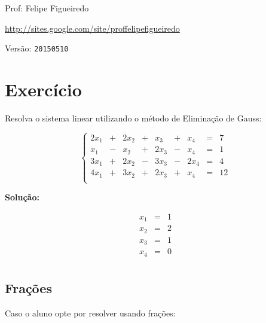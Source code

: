 \documentclass[a4paper]{article}
\begin{document}
\parbox[c]{.825\textwidth}{\raggedright%
{Prof: Felipe Figueiredo\par}
{\url{http://sites.google.com/site/proffelipefigueiredo}\par}
}

Versão: \verb|20150510|




\section{Exercício}

Resolva o sistema linear utilizando o método de Eliminação de Gauss:

\begin{displaymath}
  \left\{
    \begin{array}{ccccccccc}
      2 x_1 &+& 2 x_2  &+&  x_3 &+& x_4 &=&7\\
      x_1 &-& x_2 &+& 2 x_3 &-& x_4 &=&1\\
      3 x_1 &+& 2 x_2 &-& 3 x_3 &-& 2 x_4&=& 4\\
      4 x_1 &+& 3 x_2  &+& 2 x_3 &+& x_4 &=&12\\
    \end{array}
\right.
\end{displaymath}

{\bf Solução:}

\begin{displaymath}
  \begin{array}{ccc}
      x_1 &=& 1\\
      x_2 &=& 2\\
      x_3 &=& 1\\
      x_4 &=& 0\\
  \end{array}
\end{displaymath}

\subsection{Frações}

Caso o aluno opte por resolver usando frações:
\end{document}

